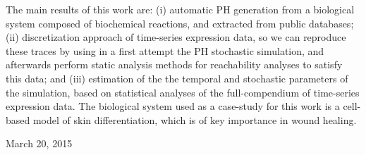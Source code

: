 The main  results of this work are: (i) automatic PH generation                                                         
from a biological system composed of biochemical reactions, and extracted from public databases;
(ii) discretization approach of time-series expression data, so we can 
reproduce these traces by using in a first attempt the PH stochastic simulation, and afterwards 
perform static analysis methods for reachability analyses to satisfy this data; and (iii) estimation of the the temporal and stochastic
parameters of the simulation, based on statistical analyses of the full-compendium of time-series expression data.
The biological system used as a case-study for this work is a cell-based model of skin differentiation, which 
is of key importance in  wound healing. 



 
\hfill March 20, 2015